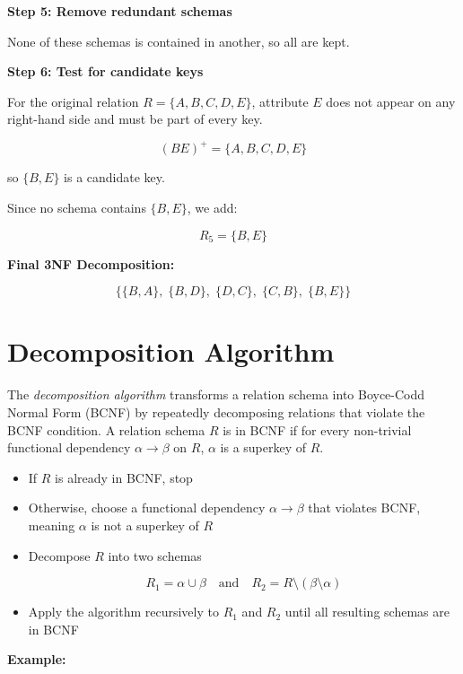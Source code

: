 \textbf{Step 5: Remove redundant schemas}

None of these schemas is contained in another, so all are kept.

\textbf{Step 6: Test for candidate keys}

For the original relation \(R = \{A, B, C, D, E\}\), attribute \(E\) does not appear on any right-hand side and must be part of 
every key.

\[
    (BE)^+ = \{A, B, C, D, E\}
\]

so \(\{B, E\}\) is a candidate key.

Since no schema contains \(\{B, E\}\), we add:

\[
    R_5 = \{B, E\}
\]

\textbf{Final 3NF Decomposition:}

\[
    \{ \{B,A\},\; \{B,D\},\; \{D,C\},\; \{C,B\},\; \{B,E\} \}
\]

\section{Decomposition Algorithm}

The \emph{decomposition algorithm} transforms a relation schema into Boyce-Codd Normal Form (BCNF) by repeatedly decomposing 
relations that violate the BCNF condition. A relation schema \(R\) is in BCNF if for every non-trivial functional dependency 
\(\alpha \to \beta\) on \(R\), \(\alpha\) is a superkey of \(R\).

\begin{itemize}

    \item If \(R\) is already in BCNF, stop

    \item Otherwise, choose a functional dependency \(\alpha \to \beta\) that violates BCNF, meaning \(\alpha\) is not a superkey of \(R\)

    \item Decompose \(R\) into two schemas

    \[
        R_1 = \alpha \cup \beta
        \quad\text{and}\quad
        R_2 = R \setminus (\beta \setminus \alpha)
    \]

    \item Apply the algorithm recursively to \(R_1\) and \(R_2\) until all resulting schemas are in BCNF

\end{itemize}

\textbf{Example:}

